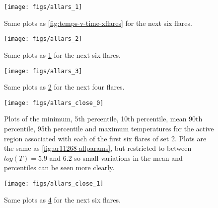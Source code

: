 \documentclass{article}
\begin{document}
\begin{figure}
\begin{centering}
\texttt{[image: figs/allars\_1]} 
\par\end{centering}

\caption{Same plots as \ref{fig:temps-v-time-xflares} for the next six flares.
\label{fig:temps-v-time-xflares-2}}
\end{figure}


\begin{figure}
\begin{centering}
\texttt{[image: figs/allars\_2]} 
\par\end{centering}

\caption{Same plots as \ref{fig:temps-v-time-xflares-2} for the next six flares.
\label{fig:temps-v-time-xflares-3}}
\end{figure}


\begin{figure}
\begin{centering}
\texttt{[image: figs/allars\_3]} 
\par\end{centering}

\caption{Same plots as \ref{fig:temps-v-time-xflares-3} for the next four
flares.\label{fig:temps-v-time-xflares-4}}
\end{figure}


\begin{figure}
\begin{centering}
\texttt{[image: figs/allars\_close\_0]} 
\par\end{centering}

\caption{Plots of the minimum, 5th percentile, 10th percentile, mean 90th percentile,
95th percentile and maximum temperatures for the active region associated
with each of the first six flares of set 2. Plots are the same as
\ref{fig:ar11268-allparams}, but restricted to between $log(T)=5.9$
and $6.2$ so small variations in the mean and percentiles can be
seen more clearly.\label{fig:temps-v-time-xflares-1}}
\end{figure}


\begin{figure}
\begin{centering}
\texttt{[image: figs/allars\_close\_1]} 
\par\end{centering}

\caption{Same plots as \ref{fig:temps-v-time-xflares-1} for the next six flares.
\label{fig:temps-v-time-xflares-1-1}}
\end{figure}
\end{document}
